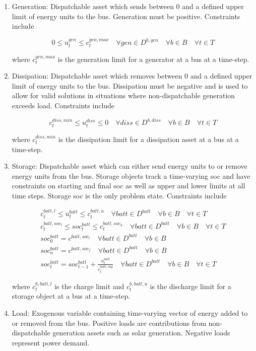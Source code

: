 \documentclass[12pt]{article}
\begin{document}
\begin{enumerate}
	\item Generation: Dispatchable asset which sends between 0 and a defined upper limit of energy units to the bus. Generation must be positive. Constraints include
	
	\begin{equation}
		0 \leq u^{gen}_t \leq c^{gen,max}_t \quad\forall gen\in D^{b,gen}\quad\forall b\in B\quad\forall t\in T
	\end{equation}
	
	where $c^{gen,max}_t$ is the generation limit for a generator at a bus at a time-step.
	
	\item Dissipation: Dispatchable asset which removes between 0 and a defined upper limit of energy units to the bus. Dissipation must be negative and is used to allow for valid solutions in situations where non-dispatchable generation exceeds load. Constraints include
	
	\begin{equation}
		c^{diss,min}_t \leq u^{diss}_t \leq 0 \quad\forall diss\in D^{b,diss}\quad\forall b\in B\quad\forall t\in T
	\end{equation}
	
	where $c^{diss,min}_t$ is the dissipation limit for a dissipation asset at a bus at a time-step.
	
	\item Storage: Dispatchable asset which can either send energy units to or remove energy units from the bus. Storage objects track a time-varying \gls{soc} and have constraints on starting and final \gls{soc} as well as upper and lower limits at all time steps. Storage \gls{soc} is the only problem state. Constraints include
	
	\begin{gather}
		c^{batt,l}_t \leq u^{batt}_t \leq c^{batt,u}_t \quad\forall batt\in D^{batt}\quad\forall b\in B\quad\forall t\in T\\
		c^{batt,soc_l}_t \leq soc^{batt}_t \leq c^{batt,soc_u}_t \quad\forall batt\in D^{batt}\quad\forall b\in B\quad\forall t\in T\\
		soc^{batt}_0=c^{batt,soc_i}\quad\forall batt\in D^{batt}\quad\forall b\in B\\
		soc^{batt}_n=c^{batt,soc_f}\quad\forall batt\in D^{batt}\quad\forall b\in B\\
		soc^{batt}_t=soc^{batt}_{t-1}+\frac{u^{batt}_t}{c^{batt,cap}_t}\quad\forall batt\in D^{batt}\quad\forall b\in B\quad\forall t\in T
	\end{gather}
	
	where $c^{b,batt,l}_t$ is the charge limit and $c^{b,batt,u}_t$ is the discharge limit for a storage object at a bus at a time-step.
	
	\item Load: Exogenous variable containing time-varying vector of energy added to or removed from the bus. Positive loads are contributions from non-dispatchable generation assets such as solar generation. Negative loads represent power demand.
\end{enumerate}
\end{document}
